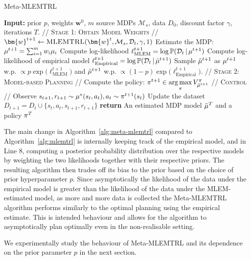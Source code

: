 \begin{algorithm}[h!]
\caption{Meta-MLEMTRL}\label{alg:meta-mlemtrl}
\begin{algorithmic}[1]
\State \textbf{Input:} prior $p$, weights $\bm{w}^0$, $m$ source MDPs $\mathcal{M}_s$, data $D_0$, discount factor $\gamma$, iterations $T$.
\State\textsc{// Stage 1: Obtain Model Weights //}
\State $\bm{w}^{t+1}\leftarrow  \textsc{MLEMTRL}(\bm{w}^t, \mathcal{M}_s, \mathcal{D}_t, \gamma, 1)$
\State Estimate the MDP: $\mu^{t+1} = \sum_{i=1}^m w_i \mu_i$
\State Compute log-likelihood $\ell_{\mathrm{MLEM}}^{t+1} = \log \mathbb{P}(\mathcal{D}_t \, | \, \mu^{t+1})$
\State Compute log-likelihood of empirical model  $\ell_{\mathrm{Empirical}}^{t+1} = \log \mathbb{P}(\mathcal{D}_t \, | \, \hat{\mu}^{t+1})$ 
\State Sample $\tilde{\mu}^{t+1}$ as $\mu^{t+1}$ w.p. $\propto p\exp\Big(\ell_{\mathrm{MLEM}}^{t+1}\Big)$ and $\hat{\mu}^{t+1}$ w.p. $\propto (1-p)\exp\Big(\ell_{\mathrm{Empirical}}^{t+1}\Big)$.\label{lin:meta-mlemtrl}
\State\textsc{// Stage 2: Model-based Planning //}
\State Compute the policy: $\pi^{t+1} \in \underset{\pi}{\arg\max} \, V_{\tilde{\mu}^{t+1}}^\pi$
\State\textsc{// Control //}
\State Observe $s_{t+1}, r_{t+1} \sim \mu^{*}(s_t, a_t), a_t\sim \pi^{t+1}(s_t)$
\State Update the dataset $D_{t+1} = D_t \cup \{s_t, a_t, s_{t+1}, r_{t+1}\}$
\EndFor
\State \textbf{return} An estimated MDP model $\tilde{\mu}^T$ and a policy $\pi^T$
\end{algorithmic}
\end{algorithm}

The main change in Algorithm~\ref{alg:meta-mlemtrl} compared to Algorithm~\ref{alg:mlemtrl} is internally keeping track of the empirical model, and in Line 8, computing a posterior probability distribution over the respective models by weighting the two likelihoods together with their respective priors. The resulting algorithm then trades off its bias to the prior based on the choice of prior hyperparameter $p$. Since asymptotically the likelihood of the data under the empirical model is greater than the likelihood of the data under the MLEM-estimated model, as more and more data is collected the Meta-MLEMTRL algorithm performs similarly to the optimal planning using the empirical estimate. This is intended behaviour and allows for the algorithm to asymptotically plan optimally even in the non-realisable setting. 

We experimentally study the behaviour of Meta-MLEMTRL and its dependence on the prior parameter $p$ in the next section.